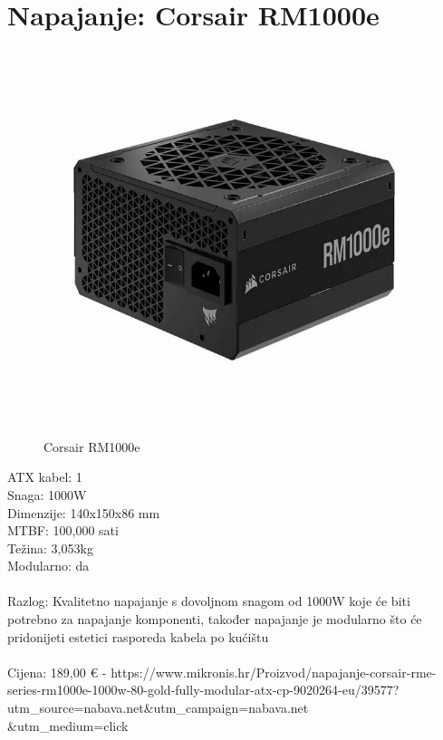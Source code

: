 \documentclass{report}
\begin{document}
\section{Napajanje: Corsair RM1000e}
\begin{figure}[H]
    \centering
    \includegraphics[scale=0.3]{Slike/napajanje.jpeg}
    \caption{Corsair RM1000e}
    \label{fig:enter-napajanje}
\end{figure}
ATX kabel: 1\\Snaga: 1000W\\Dimenzije: 140x150x86 mm\\MTBF: 100,000 sati\\Težina: 3,053kg\\Modularno: da\\\\Razlog: Kvalitetno napajanje s dovoljnom snagom od 1000W koje će biti potrebno za napajanje komponenti, također napajanje je modularno što će pridonijeti estetici rasporeda kabela po kućištu\\\\Cijena: 189,00 € - https://www.mikronis.hr/Proizvod/napajanje-corsair-rme-series-rm1000e-1000w-80-gold-fully-modular-atx-cp-9020264-eu/39577?utm\_source=nabava.net\&utm\_campaign=nabava.net\\\&utm\_medium=click
\end{document}
